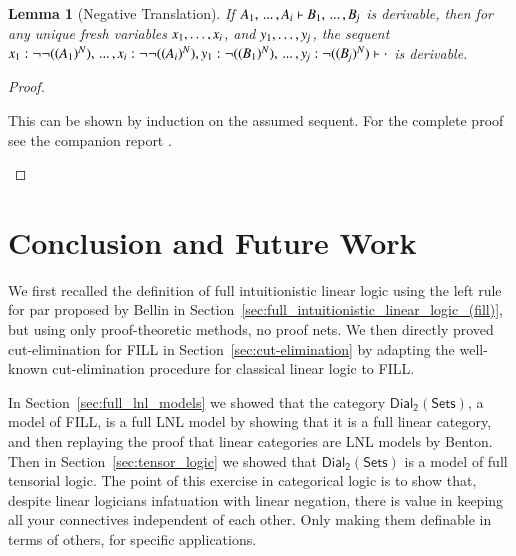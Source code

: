 \documentclass{elsarticle}
\newcommand{\dial}[0]{\mathsf{Dial_2}(\mathsf{Sets})}
\newtheorem{lemma}[theorem]{Lemma}
\begin{document}
\begin{lemma}[Negative Translation]
  \label{lemma:negative_translation}
  If $ \mathit{A_{{\mathrm{1}}}}  , \, ... \, ,  \mathit{A_{\mathit{i}}}  \vdash  \mathit{B_{{\mathrm{1}}}}  , \, ... \, ,  \mathit{B_{\mathit{j}}} $ is derivable, then for any
  unique fresh variables
  $\mathit{x_{{\mathrm{1}}}},\ldots,\mathit{x_{\mathit{i}}}$, and
  $\mathit{y_{{\mathrm{1}}}},\ldots,\mathit{y_{\mathit{j}}}$, the sequent
  $ \mathit{x_{{\mathrm{1}}}}  :   \lnot    \lnot  (   ( \mathit{A_{{\mathrm{1}}}} )^N   )     , \, ... \, ,  \mathit{x_{\mathit{i}}}  :   \lnot    \lnot  (   ( \mathit{A_{\mathit{i}}} )^N   )     ,  \mathit{y_{{\mathrm{1}}}}  :   \lnot  (   ( \mathit{B_{{\mathrm{1}}}} )^N   )   , \, ... \, ,  \mathit{y_{\mathit{j}}}  :   \lnot  (   ( \mathit{B_{\mathit{j}}} )^N   )   \vdash   \cdot  $
  is derivable.
\end{lemma}
\begin{proof}
  \begin{paper}
    This can be shown by induction on the assumed sequent.  For the
    complete proof see the companion report \cite{Eades:2015}.
  \end{paper}
  
\end{proof}



\section{Conclusion and Future Work}
\label{sec:conclusion_and_future_work}

We first recalled the definition of full intuitionistic linear logic
using the left rule for par proposed by Bellin in
Section~\ref{sec:full_intuitionistic_linear_logic_(fill)}, but using
only proof-theoretic methods, no proof nets.  We then directly proved
cut-elimination for FILL in Section~\ref{sec:cut-elimination} by
adapting the well-known cut-elimination procedure for classical linear
logic to FILL.

In Section~\ref{sec:full_lnl_models} we showed that the category
$\dial$, a model of FILL, is a full LNL model by showing that it is a
full linear category, and then replaying the proof that linear
categories are LNL models by Benton. Then in
Section~\ref{sec:tensor_logic} we showed that $\dial$ is a model of
full tensorial logic. The point of this exercise in categorical logic
is to show that, despite linear logicians infatuation with linear
negation, there is value in keeping all your connectives independent
of each other. Only making them definable in terms of others, for
specific applications.
\end{document}
